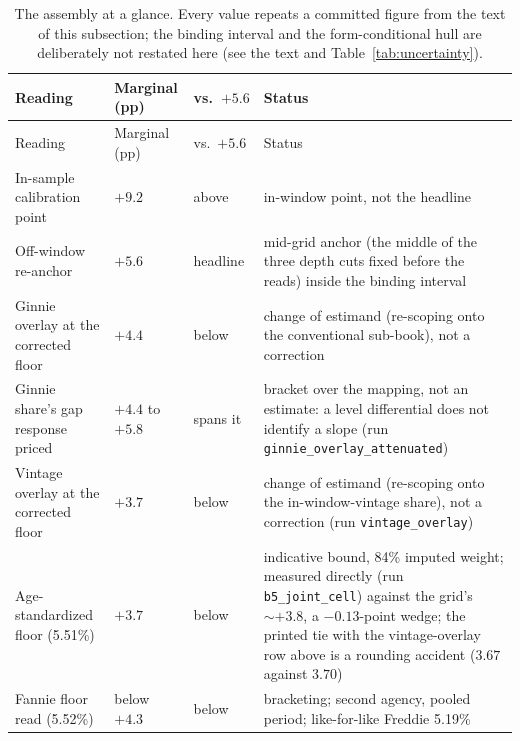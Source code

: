 \documentclass[12pt]{article}
\begin{document}
{\footnotesize
\begin{longtable}{@{}p{3.1cm}p{2.6cm}p{2.4cm}p{7.1cm}@{}}
\caption{The assembly at a glance. Every value repeats a committed figure from the text of this subsection; the binding interval and the form-conditional hull are deliberately not restated here (see the text and Table~\ref{tab:uncertainty}).}
\label{tab:assembly}\\
\toprule
Reading & Marginal (pp) & vs.\ $+5.6$ & Status \\
\midrule
\endfirsthead
\toprule
Reading & Marginal (pp) & vs.\ $+5.6$ & Status \\
\midrule
\endhead
In-sample calibration point & $+9.2$ & above & in-window point, not the headline \\
Off-window re-anchor & $+5.6$ & headline & mid-grid anchor (the middle of the three depth cuts fixed before the reads) inside the binding interval \\
Ginnie overlay at the corrected floor & $+4.4$ & below & change of estimand (re-scoping onto the conventional sub-book), not a correction \\
Ginnie share's gap response priced & $+4.4$ to $+5.8$ & spans it & bracket over the mapping, not an estimate: a level differential does not identify a slope (run \texttt{ginnie\_overlay\_attenuated}) \\ Vintage overlay at the corrected floor & $+3.7$ & below & change of estimand (re-scoping onto the in-window-vintage share), not a correction (run \texttt{vintage\_overlay}) \\
Age-standardized floor (5.51\%) & $+3.7$ & below & indicative bound, 84\% imputed weight; measured directly (run \texttt{b5\_joint\_cell}) against the grid's $\sim +3.8$, a $-0.13$-point wedge; the printed tie with the vintage-overlay row above is a rounding accident ($3.67$ against $3.70$) \\
Fannie floor read (5.52\%) & below $+4.3$ & below & bracketing; second agency, pooled period; like-for-like Freddie 5.19\% \\

\end{longtable}}
\end{document}
